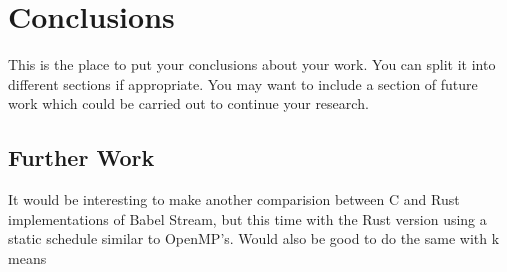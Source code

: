 \chapter{Conclusions}

This is the place to put your conclusions about your work. You can
split it into different sections if appropriate. You may want to include
a section of future work which could be carried out to continue your
research.

\section{Further Work}\label{sec:furth}
It would be interesting to make another comparision between C and Rust implementations of Babel Stream, but this time with the Rust version using a static schedule similar to OpenMP's. Would also be good to do the same with k means
